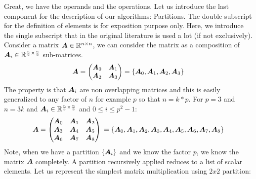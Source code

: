 \documentclass[acmsmall]{acmart}
\begin{document}
Great, we have the operands and the operations. Let us introduce the
last component for the description of our algorithms: Partitions.  The
double subscript for the definition of elements is for exposition
purpose only. Here, we introduce the single subscript that in the
original literature is used a lot (if not exclusively). Consider a
matrix ${\boldsymbol A} \in \mathbb{R}^{n\times n}$, we can consider the matrix as a
composition of ${\boldsymbol A}_i \in \mathbb{R}^{\frac{n}{2}\times \frac{n}{2}}$
sub-matrices.
\begin{equation} 
  {\boldsymbol A} =
  \begin{pmatrix}
    {\boldsymbol A}_0 & {\boldsymbol A}_1 \\
    {\boldsymbol A}_2 & {\boldsymbol A}_3 \\
  \end{pmatrix} = \{ {\boldsymbol A}_0 , {\boldsymbol A}_1, {\boldsymbol A}_2 , {\boldsymbol A}_3  \}
\end{equation}
The property is that ${\boldsymbol A}_i$ are non overlapping matrices and this
is easily generalized to any factor of $n$ for example $p$ so that $n
= k*p$. For $p=3$ and $n=3k$ and ${\boldsymbol A}_i \in \mathbb{R}^{\frac{n}{3}\times
  \frac{n}{3}}$ and $0\leq i\leq p^2 -1$:
\begin{equation} 
  {\boldsymbol A} =
  \begin{pmatrix}
    {\boldsymbol A}_0 & {\boldsymbol A}_1 & {\boldsymbol A}_2 \\
    {\boldsymbol A}_3 & {\boldsymbol A}_4 & {\boldsymbol A}_{5} \\
    {\boldsymbol A}_6 & {\boldsymbol A}_7 & {\boldsymbol A}_8 \\
  \end{pmatrix}\\
  = \{ {\boldsymbol A}_0 , {\boldsymbol A}_1, {\boldsymbol A}_2 , {\boldsymbol A}_3 ,{\boldsymbol A}_4 , {\boldsymbol A}_5, {\boldsymbol A}_6 , {\boldsymbol A}_7, {\boldsymbol A}_8   \}
\end{equation}
Note, when we have a partition $\{ {\boldsymbol A}_i \}$ and we know the factor
$p$, we know the matrix ${\boldsymbol A}$ completely. A partition recursively
applied reduces to a list of scalar elements. Let us represent the
simplest matrix multiplication using $2x2$ partition:
\end{document}
